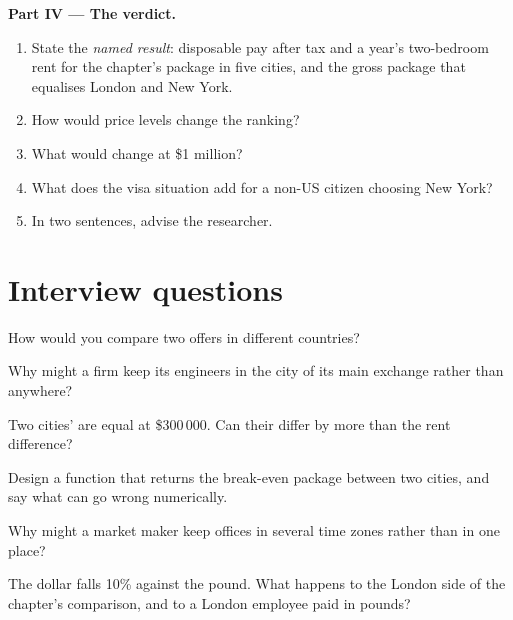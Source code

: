 \begin{problem}
\medskip\noindent\textbf{Part IV --- The verdict.}
\begin{enumerate}[resume]
\item State the \emph{named result}: disposable pay after tax and a year's two-bedroom rent for the chapter's package in
five cities, and the gross package that equalises London and New York.
\item How would price levels change the ranking?
\item What would change at \$1 million?
\item What does the visa situation add for a non-US citizen choosing New York?
\item In two sentences, advise the researcher.
\end{enumerate}
\end{problem}

\section{Interview questions}

\begin{interviewq}\label{iq:in:locations:1}
How would you compare two offers in different countries?
\end{interviewq}

\begin{interviewq}\label{iq:in:locations:2}
Why might a firm keep its engineers in the city of its main exchange rather than anywhere?
\end{interviewq}

\begin{interviewq}\label{iq:in:locations:3}
Two cities'  are equal at \$300\,000. Can their  differ by more than the rent
difference?
\end{interviewq}

\begin{interviewq}\label{iq:in:locations:4}
Design a function that returns the break-even package between two cities, and say what can go wrong numerically.
\end{interviewq}

\begin{interviewq}\label{iq:in:locations:5}
Why might a market maker keep offices in several time zones rather than in one place?
\end{interviewq}

\begin{interviewq}\label{iq:in:locations:6}
The dollar falls 10\% against the pound. What happens to the London side of the chapter's comparison, and to a London
employee paid in pounds?
\end{interviewq}
